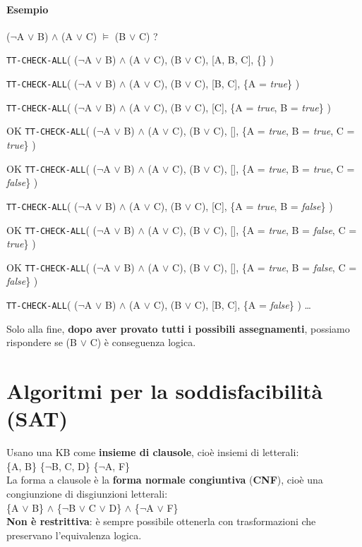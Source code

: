 \documentclass[10pt]{book}
\begin{document}
\paragraph{Esempio}
\begin{list}{}{($\neg$A $\vee$ B) $\wedge$ (A $\vee$ C) $\vDash$ (B $\vee$ C) ?}
	\item \texttt{TT-CHECK-ALL}( ($\neg$A $\vee$ B) $\wedge$ (A $\vee$ C), (B $\vee$ C), [A, B, C], \{\} )
	\begin{list}{}{}
		\item \texttt{TT-CHECK-ALL}( ($\neg$A $\vee$ B) $\wedge$ (A $\vee$ C), (B $\vee$ C), [B, C], \{A = \textit{true}\} )
		\begin{list}{}{}
			\item \texttt{TT-CHECK-ALL}( ($\neg$A $\vee$ B) $\wedge$ (A $\vee$ C), (B $\vee$ C), [C], \{A = \textit{true}, B = \textit{true}\} )
			\begin{list}{}{}
				\item[OK] \texttt{TT-CHECK-ALL}( ($\neg$A $\vee$ B) $\wedge$ (A $\vee$ C), (B $\vee$ C), [], \{A = \textit{true}, B = \textit{true}, C = \textit{true}\} )
				\item[OK] \texttt{TT-CHECK-ALL}( ($\neg$A $\vee$ B) $\wedge$ (A $\vee$ C), (B $\vee$ C), [], \{A = \textit{true}, B = \textit{true}, C = \textit{false}\} )
			\end{list}
			\item \texttt{TT-CHECK-ALL}( ($\neg$A $\vee$ B) $\wedge$ (A $\vee$ C), (B $\vee$ C), [C], \{A = \textit{true}, B = \textit{false}\} )
			\begin{list}{}{}
				\item[OK] \texttt{TT-CHECK-ALL}( ($\neg$A $\vee$ B) $\wedge$ (A $\vee$ C), (B $\vee$ C), [], \{A = \textit{true}, B = \textit{false}, C = \textit{true}\} )
				\item[OK] \texttt{TT-CHECK-ALL}( ($\neg$A $\vee$ B) $\wedge$ (A $\vee$ C), (B $\vee$ C), [], \{A = \textit{true}, B = \textit{false}, C = \textit{false}\} )
			\end{list}
		\end{list}
		\item \texttt{TT-CHECK-ALL}( ($\neg$A $\vee$ B) $\wedge$ (A $\vee$ C), (B $\vee$ C), [B, C], \{A = \textit{false}\} ) \ldots
	\end{list}
\end{list}
Solo alla fine, \textbf{dopo aver provato tutti i possibili assegnamenti}, possiamo rispondere se (B $\vee$ C) è conseguenza logica.
\section{Algoritmi per la soddisfacibilità (SAT)}
Usano una KB come \textbf{insieme di clausole}, cioè insiemi di letterali:\\\{A, B\} \{$\neg$B, C, D\} \{$\neg$A, F\}\\
La forma a clausole è la \textbf{forma normale congiuntiva} (\textbf{CNF}), cioè una congiunzione di disgiunzioni letterali:\\ 
\{A $\vee$ B\} $\wedge$ \{$\neg$B $\vee$ C $\vee$ D\} $\wedge$ \{$\neg$A $\vee$ F\}\\
\textbf{Non è restrittiva}: è sempre possibile ottenerla con trasformazioni che preservano l'equivalenza logica.
\end{document}
